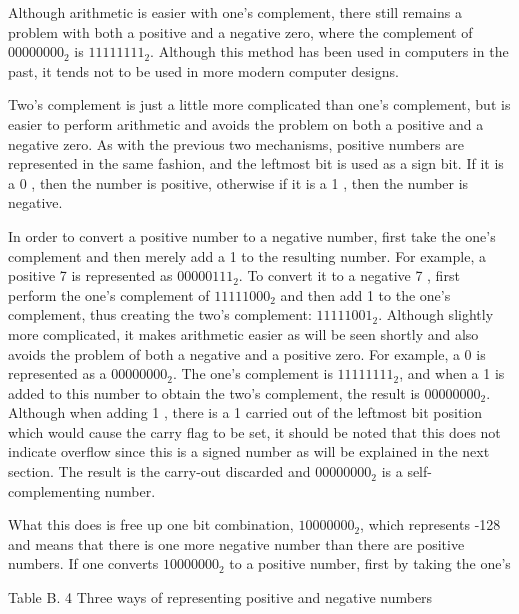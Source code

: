 \documentclass[10pt]{article}
\begin{document}
Although arithmetic is easier with one's complement, there still remains a problem with both a positive and a negative zero, where the complement of $00000000_{2}$ is $11111111_{2}$. Although this method has been used in computers in the past, it tends not to be used in more modern computer designs.

Two's complement is just a little more complicated than one's complement, but is easier to perform arithmetic and avoids the problem on both a positive and a negative zero. As with the previous two mechanisms, positive numbers are represented in the same fashion, and the leftmost bit is used as a sign bit. If it is a 0 , then the number is positive, otherwise if it is a 1 , then the number is negative.

In order to convert a positive number to a negative number, first take the one's complement and then merely add a 1 to the resulting number. For example, a positive 7 is represented as $00000111_{2}$. To convert it to a negative 7 , first perform the one's complement of $11111000_{2}$ and then add 1 to the one's complement, thus creating the two's complement: $11111001_{2}$. Although slightly more complicated, it makes arithmetic easier as will be seen shortly and also avoids the problem of both a negative and a positive zero. For example, a 0 is represented as a $00000000_{2}$. The one's complement is $11111111_{2}$, and when a 1 is added to this number to obtain the two's complement, the result is $00000000_{2}$. Although when adding 1 , there is a 1 carried out of the leftmost bit position which would cause the carry flag to be set, it should be noted that this does not indicate overflow since this is a signed number as will be explained in the next section. The result is the carry-out discarded and $00000000_{2}$ is a self-complementing number.

What this does is free up one bit combination, $10000000_{2}$, which represents -128 and means that there is one more negative number than there are positive numbers. If one converts $10000000_{2}$ to a positive number, first by taking the one's

Table B. 4 Three ways of representing positive and negative numbers
\end{document}
